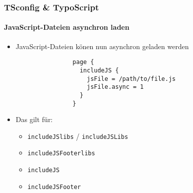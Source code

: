
\begin{frame}[fragile]
	\frametitle{TSconfig \& TypoScript}
	\framesubtitle{JavaScript-Dateien asynchron laden}

	\begin{itemize}
		\item JavaScript-Dateien könen nun asynchron geladen werden

			\begin{lstlisting}
				page {
				  includeJS {
				    jsFile = /path/to/file.js
				    jsFile.async = 1
				  }
				}
			\end{lstlisting}

		\item Das gilt für:

			\begin{itemize}
				\item \texttt{includeJSlibs} / \texttt{includeJSLibs}
				\item \texttt{includeJSFooterlibs}
				\item \texttt{includeJS}
				\item \texttt{includeJSFooter}
			\end{itemize}

	\end{itemize}

\end{frame}


